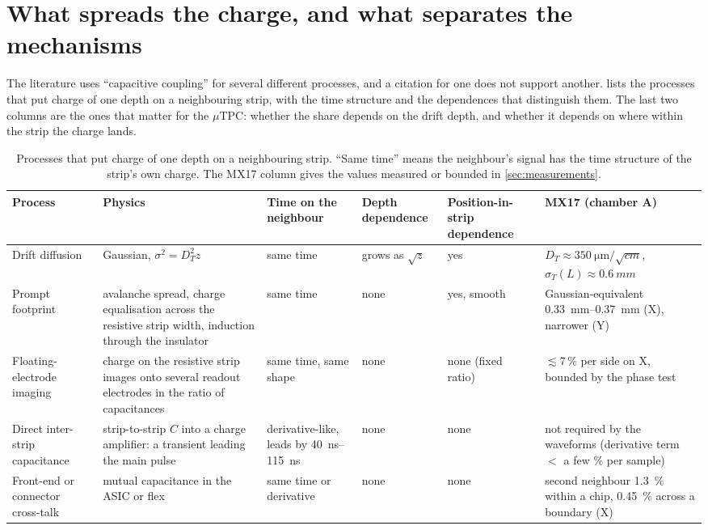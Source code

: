 \section{What spreads the charge, and what separates the mechanisms}\label{sec:mechanisms}

The literature uses ``capacitive coupling'' for several different processes, and a citation for one does not support another.
 lists the processes that put charge of one depth on a neighbouring strip, with the time structure and the
dependences that distinguish them. The last two columns are the ones that matter for the $\mu$TPC: whether the share depends on
the drift depth, and whether it depends on where within the strip the charge lands.

\begin{table}[t]
  \centering\footnotesize
  \caption{Processes that put charge of one depth on a neighbouring strip. ``Same time'' means the neighbour's signal has the
  time structure of the strip's own charge. The MX17 column gives the values measured or bounded in \cref{sec:measurements}.}
  \label{tab:mechanisms}
  \begin{tabular}{@{}p{2.7cm}p{3.1cm}p{1.8cm}p{1.6cm}p{1.6cm}p{2.8cm}@{}}
    \toprule
    Process & Physics & Time on the neighbour & Depth dependence & Position-in-strip dependence & MX17 (chamber A) \\
    \midrule
    Drift diffusion & Gaussian, $\sigma^2 = D_T^2 z$ & same time & grows as $\sqrt{z}$ & yes & $D_T \approx \SI{350}{\micro\metre\per\sqrt{cm}}$, $\sigma_T(L) \approx \SI{0.6}{mm}$ \\
    Prompt footprint & avalanche spread, charge equalisation across the resistive strip width, induction through the insulator & same time & none & yes, smooth & Gaussian-equivalent \SIrange{0.33}{0.37}{mm} (X), narrower (Y) \\
    Floating-electrode imaging & charge on the resistive strip images onto several readout electrodes in the ratio of capacitances & same time, same shape & none & none (fixed ratio) & $\lesssim 7\,\%$ per side on X, bounded by the phase test \\
    Direct inter-strip capacitance & strip-to-strip $C$ into a charge amplifier: a transient leading the main pulse & derivative-like, leads by \SIrange{40}{115}{ns} & none & none & not required by the waveforms (derivative term $<$ a few \% per sample) \\
    Front-end or connector cross-talk & mutual capacitance in the ASIC or flex & same time or derivative & none & none & second neighbour \SI{1.3}{\%} within a chip, \SI{0.45}{\%} across a boundary (X) \\

\end{tabular}
\end{table}
